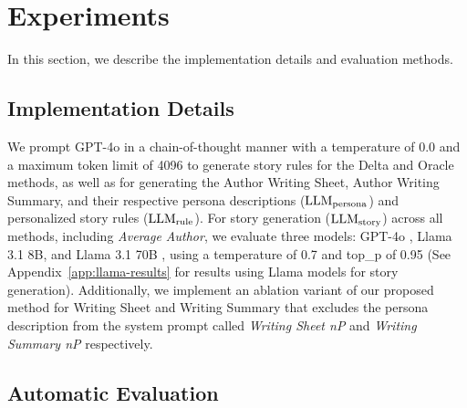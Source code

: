 \section{Experiments}
In this section, we describe the implementation details and evaluation methods. 

\subsection{Implementation Details}
We prompt GPT-4o in a chain-of-thought manner \citep{wei2022chain, shashidhar-etal-2024-unsupervised} with a temperature of 0.0 and a maximum token limit of 4096 to generate story rules for the Delta and Oracle methods, as well as for generating the Author Writing Sheet, Author Writing Summary, and their respective persona descriptions (\(\text{LLM\textsubscript{persona}}\)) and personalized story rules (\(\text{LLM\textsubscript{rule}}\)). For story generation (\(\text{LLM\textsubscript{story}}\)) across all methods, including \emph{Average Author}, we evaluate three models: GPT-4o \citep{bubeck2023sparks}, Llama 3.1 8B, and Llama 3.1 70B \citep{dubey2024llama}, using a temperature of 0.7 and top\_p of 0.95 \citep{wang-etal-2024-rolellm} (See Appendix~\ref{app:llama-results} for results using Llama models for story generation). Additionally, we implement an ablation variant of our proposed method for Writing Sheet and Writing Summary that excludes the persona description from the system prompt called \emph{Writing Sheet nP} and \emph{Writing Summary nP} respectively.  


\subsection{Automatic Evaluation}

